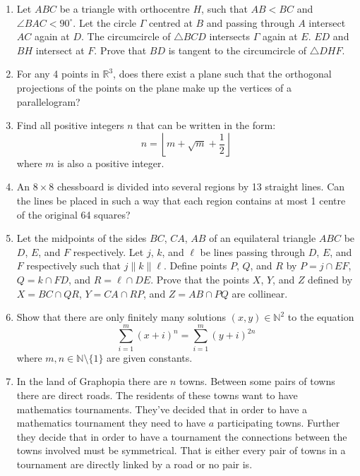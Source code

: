 \documentclass{article}
\begin{document}
\begin{enumerate}

\medskip
\item %
Let $ABC$ be a triangle with orthocentre $H$, such that $AB<BC$ and $\angle BAC < 90^\circ$. Let the circle $\Gamma$ centred at $B$ and passing through $A$ intersect $AC$ again at $D$. The circumcircle of $\triangle BCD$ intersects $\Gamma$ again at $E$. $ED$ and $BH$ intersect at $F$. Prove that $BD$ is tangent to the circumcircle of $\triangle DHF$.


\medskip
\item  %
For any 4 points in $\mathbb{R}^3$, does there exist a plane such that the orthogonal projections of the points on the plane make up the vertices of a parallelogram?


\medskip
\item %
Find all positive integers $n$ that can be written in the form:
$$n = \left\lfloor m + \sqrt{m} + \frac{1}{2} \right\rfloor$$
where $m$ is also a positive integer.


\medskip
\item %
An $8 \times 8$ chessboard is divided into several regions by 13 straight lines. Can the lines be placed in such a way that each region contains at most 1 centre of the original 64 squares?


\medskip
\item %
Let the midpoints of the sides $BC$, $CA$, $AB$ of an equilateral triangle $ABC$ be $D$, $E$, and $F$ respectively. Let $j$, $k$, and $\ell$ be lines passing through $D$, $E$, and $F$ respectively such that $j \parallel k \parallel \ell$. Define points $P$, $Q$, and $R$ by $P = j\cap EF$, $Q = k \cap FD$, and $R = \ell \cap DE$. Prove that the points $X$, $Y$, and $Z$ defined by $X = BC \cap QR$, $Y = CA \cap RP$, and $Z = AB \cap PQ$ are  collinear.


\medskip
\item %
Show that there are only finitely many solutions $(x, y) \in \mathbb{N}^2$ to the equation
$$\sum_{i = 1}^{m} (x + i)^n = \sum_{i = 1}^{m} (y + i)^{2n}$$
where $m, n \in \mathbb{N} \setminus \{1\}$ are given constants.


\medskip
\item %
In the land of Graphopia there are $n$ towns. Between some pairs of towns there are direct roads. The residents of these towns want to have mathematics tournaments. They've decided that in order to have a mathematics tournament they need to have $a$ participating towns. Further they decide that in order to have a tournament the connections between the towns involved must be symmetrical. That is either every pair of towns in a tournament are directly linked by a road or no pair is. 


\end{enumerate}
\end{document}
